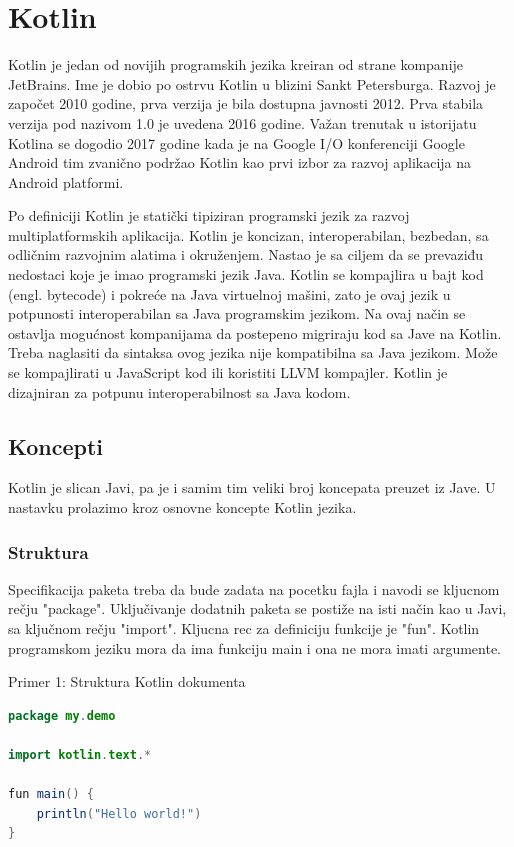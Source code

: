 \documentclass[12pt,oneside]{memoir}
\begin{document}
\section{Kotlin}
Kotlin je jedan od novijih programskih jezika kreiran od strane kompanije JetBrains. Ime je dobio po ostrvu Kotlin u blizini Sankt Petersburga. Razvoj je započet 2010 godine, prva verzija je bila dostupna javnosti 2012. Prva stabila verzija pod nazivom 1.0 je uvedena 2016 godine. Važan trenutak u istorijatu Kotlina se dogodio 2017 godine kada je na Google I/O konferenciji Google Android tim zvanično podržao Kotlin kao prvi izbor za razvoj aplikacija na Android platformi. 
 
 
Po definiciji Kotlin je statički tipiziran programski jezik za razvoj multiplatformskih aplikacija. Kotlin je koncizan, interoperabilan, bezbedan, sa odličnim razvojnim alatima i okruženjem. Nastao je sa ciljem da se prevaziđu nedostaci koje je imao programski jezik Java. Kotlin se kompajlira u bajt kod (engl. bytecode) i pokreće na Java virtuelnoj mašini, zato je ovaj jezik u potpunosti interoperabilan sa Java programskim jezikom. Na ovaj način se ostavlja mogućnost kompanijama da postepeno migriraju kod sa Jave na Kotlin. Treba naglasiti da sintaksa ovog jezika nije kompatibilna sa Java jezikom. Može se kompajlirati u JavaScript kod ili koristiti LLVM kompajler. Kotlin je dizajniran za potpunu interoperabilnost sa Java kodom.

 
\subsection{Koncepti}
Kotlin je slican Javi, pa je i samim tim veliki broj koncepata preuzet iz Jave. U nastavku prolazimo kroz osnovne koncepte Kotlin jezika. 
\subsubsection{Struktura}
Specifikacija paketa treba da bude zadata na pocetku fajla i navodi se kljucnom rečju "package". Uključivanje dodatnih paketa se postiže na isti način kao u Javi, sa ključnom rečju "import". Kljucna rec za definiciju funkcije je "fun". Kotlin programskom jeziku mora da ima funkciju main i ona ne mora imati argumente. 
 
\begin{center} Primer 1: Struktura Kotlin dokumenta\end{center}
\begin{lstlisting}[language=Java]
package my.demo
 
import kotlin.text.*
 
fun main() {
    println("Hello world!")
}
\end{lstlisting}
 
\end{document}
